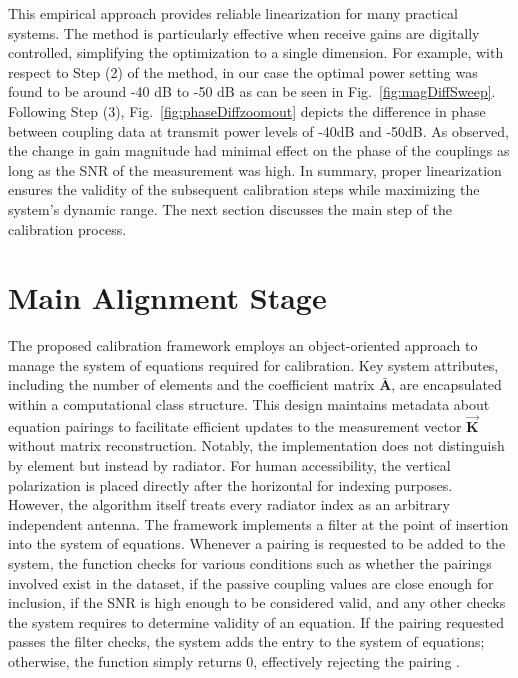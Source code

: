 \documentclass[journal]{IEEEtran}
\begin{document}
\noindent 
This empirical approach provides reliable linearization for many practical systems. The method is particularly effective when receive gains are digitally controlled, simplifying the optimization to a single dimension. 
For example, with respect to Step (2) of the method, in our case the optimal
power setting was found to be around -40 dB to -50 dB as can be
seen in Fig.~\ref{fig:magDiffSweep}. 
Following Step (3), Fig.~\ref{fig:phaseDiffzoomout} depicts the difference in phase between coupling data at transmit power levels of -40dB and -50dB.
As observed, the change in gain magnitude had minimal effect on the phase of the couplings as long as the SNR of the measurement was high.
In summary, proper linearization ensures the validity of the subsequent calibration steps while maximizing the system’s dynamic range. The next section discusses the main step of the calibration process. 



\section{Main Alignment Stage}
The proposed calibration framework employs an object-oriented approach to manage the system of equations required for calibration. Key system attributes, including the number of elements and the coefficient matrix $\bar{\mathbf{A}}$, are encapsulated within a computational class structure. This design maintains metadata about equation pairings to facilitate efficient updates to the measurement vector $\vec{\mathbf{K}}$ without matrix reconstruction. Notably, the implementation does not distinguish by element but instead by radiator. For human accessibility, the vertical polarization is placed directly after the horizontal for indexing purposes. However, the algorithm itself treats every radiator index as an arbitrary independent antenna. The framework implements a filter at the point of insertion into the system of equations. Whenever a pairing is requested to be added to the system, the function checks for various conditions such as whether the pairings involved exist in the dataset, if the passive coupling values are close enough for inclusion, if the SNR is high enough to be considered valid, and any other checks the system requires to determine validity of an equation. If the pairing requested passes the filter checks, the system adds the entry to the system of equations; otherwise, the function simply returns 0, effectively rejecting the pairing \cite{sasser}. 
\end{document}
